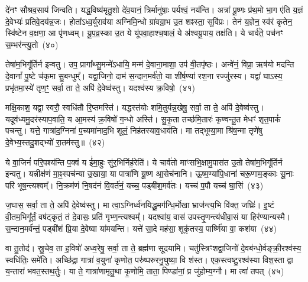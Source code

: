 दे॑नꣳ सौश्रव॒साय॑ जिन्वति। यद्ध॒विष्य॑मृतु॒शो दे॑व॒यानं॒ त्रिर्मानु॑षाः॒ पर्यश्वं॒ नय॑न्ति। अत्रा॑ पू॒ष्णः प्र॑थ॒मो भा॒ग ए॑ति य॒ज्ञं दे॒वेभ्यः॑ प्रतिवे॒दय॑न्न॒जः। होता᳚\-ऽ\-ध्व॒र्युराव॑या अग्निमि॒न्धो ग्रा॑वग्रा॒भ उ॒त शꣴस्ता॒ सुवि॑प्रः। तेन॑ य॒ज्ञेन॒ स्व॑रं कृतेन॒ स्वि॑ष्टेन व॒क्षणा॒ आ पृ॑णध्वम्। यू॒प॒व्र॒स्का उ॒त ये यू॑पवा॒हाश्च॒षालं॒ ये अ॑श्वयू॒पाय॒ तक्ष॑ति। ये चार्व॑ते॒ पच॑नꣳ स॒म्भर॑न्त्यु॒तो~(४०)\ip

तेषा॑म॒भिगू᳚र्तिर्न इन्वतु। उप॒ प्रागा᳚थ्सु॒मन्मे॑\-ऽधायि॒ मन्म॑ दे॒वाना॒माशा॒ उप॑ वी॒तपृ॑ष्ठः। अन्वे॑नं॒ विप्रा॒ ऋष॑यो मदन्ति दे॒वानां᳚ पु॒ष्टे च॑कृमा सु॒बन्धुम्᳚। यद्वा॒जिनो॒ दाम॑ स॒न्दान॒मर्व॑तो॒ या शी॑र्\mbox{}ष॒ण्या॑ रश॒ना रज्जु॑रस्य। यद्वा॑ घाऽस्य॒ प्रभृ॑तमा॒स्ये॑ तृण॒ꣳ॒ सर्वा॒ ता ते॒ अपि॑ दे॒वेष्व॑स्तु। यदश्व॑स्य क्र॒विषो॒~(४१)\ip

मक्षि॒काश॒ यद्वा॒ स्वरौ॒ स्वधि॑तौ रि॒प्तमस्ति॑। यद्धस्त॑योः शमि॒तुर्यन्न॒खेषु॒ सर्वा॒ ता ते॒ अपि॑ दे॒वेष्व॑स्तु। यदूव॑ध्यमु॒दर॑स्याप॒वाति॒ य आ॒मस्य॑ क्र॒विषो॑ ग॒न्धो अस्ति॑। सु॒कृ॒ता तच्छ॑मि॒तारः॑ कृण्वन्तू॒त मेधꣳ॑ शृत॒पाकं॑ पचन्तु। यत्ते॒ गात्रा॑द॒ग्निना॑ प॒च्यमा॑नाद॒भि शूलं॒ निह॑तस्याव॒धाव॑ति। मा तद्भूम्या॒मा श्रि॑ष॒न्मा तृणे॑षु दे॒वेभ्य॒स्तदु॒शद्भ्यो॑ रा॒तम॑स्तु॥~(४२)\ip

{\anuvakamend[{इदु॒तो क्र॒विषः॑ श्रिषथ्स॒प्त च॑}]}

ये वा॒जिनं॑ परि॒पश्य॑न्ति प॒क्वं य ई॑मा॒हुः सु॑र॒भिर्निर्\mbox{}ह॒रेति॑। ये चार्व॑तो माꣳसभि॒क्षामु॒पास॑त उ॒तो तेषा॑म॒भिगू᳚र्तिर्न इन्वतु। यन्नीक्ष॑णं मा॒ꣴ॒स्पच॑न्या उ॒खाया॒ या पात्रा॑णि यू॒ष्ण आ॒सेच॑नानि। ऊ॒ष्म॒ण्या॑पि॒धाना॑ चरू॒णाम॒ङ्काः सू॒नाः परि॑ भूष॒न्त्यश्वम्᳚। नि॒क्रम॑णं नि॒षद॑नं वि॒वर्त॑नं॒ यच्च॒ पड्बी॑श॒मर्व॑तः। यच्च॑ प॒पौ यच्च॑ घा॒सिं~(४३)\ip

ज॒घास॒ सर्वा॒ ता ते॒ अपि॑ दे॒वेष्व॑स्तु। मा त्वा॒\-ऽ\-ग्निर्ध्व॑नयिद्धू॒मग॑न्धि॒र्मोखा भ्राज॑न्त्य॒भि वि॑क्त॒ जघ्रिः॑। इ॒ष्टं वी॒तम॒भिगू᳚र्तं॒ वष॑ट्कृतं॒ तं दे॒वासः॒ प्रति॑ गृभ्ण॒न्त्यश्वम्᳚। यदश्वा॑य॒ वास॑ उपस्तृ॒णन्त्य॑धीवा॒सं या हिर॑ण्यान्यस्मै। स॒न्दान॒मर्व॑न्तं॒ पड्बी॑शं प्रि॒या दे॒वेष्वा या॑मयन्ति। यत्ते॑ सा॒दे मह॑सा॒ शूकृ॑तस्य॒ पार्ष्णि॑या वा॒ कश॑या~(४४)\ip

वा तु॒तोद॑। स्रु॒चेव॒ ता ह॒विषो॑ अध्व॒रेषु॒ सर्वा॒ ता ते॒ ब्रह्म॑णा सूदयामि। चतु॑स्त्रिꣳशद्वा॒जिनो॑ दे॒वब॑न्धो॒र्वङ्क्री॒रश्व॑स्य॒ स्वधि॑तिः॒ समे॑ति। अच्छि॑द्रा॒ गात्रा॑ व॒युना॑ कृणोत॒ परु॑ष्परुरनु॒घुष्या॒ वि श॑स्त। एक॒स्त्वष्टु॒रश्व॑स्या विश॒स्ता द्वा य॒न्तारा॑ भवत॒स्तथ॒र्तुः। या ते॒ गात्रा॑णामृतु॒था कृ॒णोमि॒ ताता॒ पिण्डा॑नां॒ प्र जु॑होम्य॒ग्नौ। मा त्वा॑ तपत्~(४५)\ip

